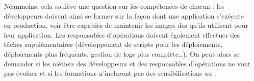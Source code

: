 Néanmoins, cela soulève une question sur les compétences de chacun : les développeurs doivent ainsi se former sur la façon dont une application s'exécute en production, voir être capables de maintenir les images des  qu'ils utilisent pour leur application. Les responsables d'opérations doivent également effectuer des tâches supplémentaires (développement de scripts pour les déploiements, déploiements plus fréquents, gestion de logs plus complète\ldots). On peut alors se demander si les métiers des développeurs et des responsables d'opérations ne vont pas évoluer et si les formations n'incluront pas des sensibilisations au \devops{}.
